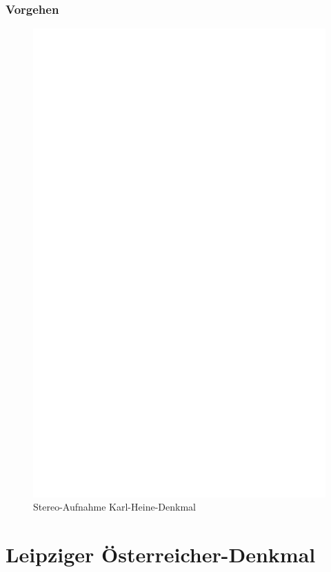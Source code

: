 \documentclass[liststotoc,bibtotoc,fontsize=14pt,]{scrreprt}
\begin{document}
\subsubsection{Vorgehen}

\newpage
\begin{figure}[h]
	\includegraphics[width=\linewidth]{img/ph.jpg}
	\caption{Stereo-Aufnahme Karl-Heine-Denkmal}
\end{figure}

\section{Leipziger Österreicher-Denkmal}
\label{sec:nikolai}
\end{document}
